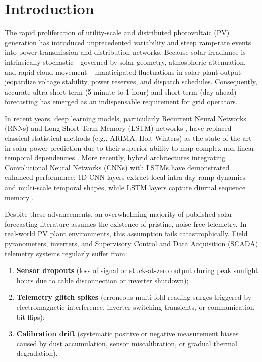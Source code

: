 \documentclass[conference]{IEEEtran}
\begin{document}
\section{Introduction}

The rapid proliferation of utility-scale and distributed photovoltaic (PV) generation has introduced unprecedented variability and steep ramp-rate events into power transmission and distribution networks. Because solar irradiance is intrinsically stochastic---governed by solar geometry, atmospheric attenuation, and rapid cloud movement---unanticipated fluctuations in solar plant output jeopardize voltage stability, power reserves, and dispatch schedules. Consequently, accurate ultra-short-term (5-minute to 1-hour) and short-term (day-ahead) forecasting has emerged as an indispensable requirement for grid operators.

In recent years, deep learning models, particularly Recurrent Neural Networks (RNNs) and Long Short-Term Memory (LSTM) networks \cite{hochreiter1997lstm}, have replaced classical statistical methods (e.g., ARIMA, Holt-Winters) as the state-of-the-art in solar power prediction due to their superior ability to map complex non-linear temporal dependencies \cite{mellit2021deep, sobri2018review}. More recently, hybrid architectures integrating Convolutional Neural Networks (CNNs) with LSTMs have demonstrated enhanced performance: 1D-CNN layers extract local intra-day ramp dynamics and multi-scale temporal shapes, while LSTM layers capture diurnal sequence memory \cite{zang2020cnnlstm, obiora2021hourly, qu2021dayahead, boucetta2024enhanced}.

Despite these advancements, an overwhelming majority of published solar forecasting literature assumes the existence of pristine, noise-free telemetry. In real-world PV plant environments, this assumption fails catastrophically. Field pyranometers, inverters, and Supervisory Control and Data Acquisition (SCADA) telemetry systems regularly suffer from:
\begin{enumerate}
    \item \textbf{Sensor dropouts} (loss of signal or stuck-at-zero output during peak sunlight hours due to cable disconnection or inverter shutdown);
    \item \textbf{Telemetry glitch spikes} (erroneous multi-fold reading surges triggered by electromagnetic interference, inverter switching transients, or communication bit flips);
    \item \textbf{Calibration drift} (systematic positive or negative measurement biases caused by dust accumulation, sensor miscalibration, or gradual thermal degradation).
\end{enumerate}
\end{document}
